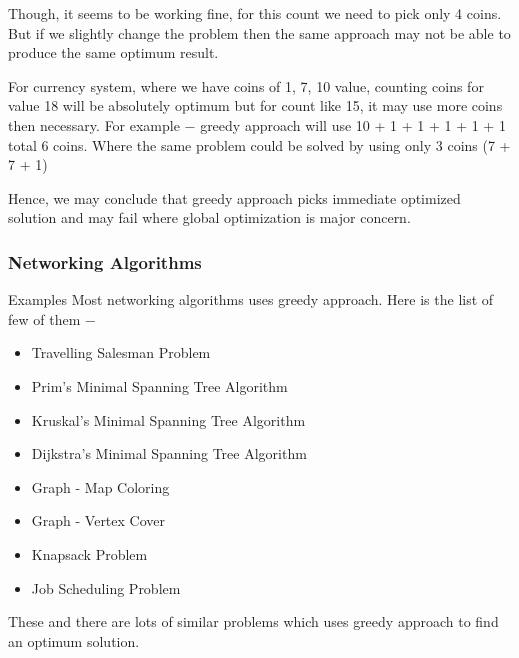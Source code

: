 \documentclass{beamer}
\begin{document}
\begin{frame}

Though, it seems to be working fine, for this count we need to pick only 4 coins. But if we slightly change the problem then the same approach may not be able to produce the same optimum result.

For currency system, where we have coins of 1, 7, 10 value, counting coins for value 18 will be absolutely optimum but for count like 15, it may use more coins then necessary. For example − greedy approach will use 10 + 1 + 1 + 1 + 1 + 1 total 6 coins. Where the same problem could be solved by using only 3 coins (7 + 7 + 1)

Hence, we may conclude that greedy approach picks immediate optimized solution and may fail where global optimization is major concern.
\end{frame}
\begin{frame}
\frametitle{Networking Algorithms}
\large
Examples
Most networking algorithms uses greedy approach. Here is the list of few of them −
\begin{itemize}
\item Travelling Salesman Problem
\item Prim's Minimal Spanning Tree Algorithm
\item Kruskal's Minimal Spanning Tree Algorithm
\item Dijkstra's Minimal Spanning Tree Algorithm
\item Graph - Map Coloring
\item Graph - Vertex Cover
\item Knapsack Problem
\item Job Scheduling Problem
\end{itemize}
These and there are lots of similar problems which uses greedy approach to find an optimum solution.

\end{frame}

\end{document}
